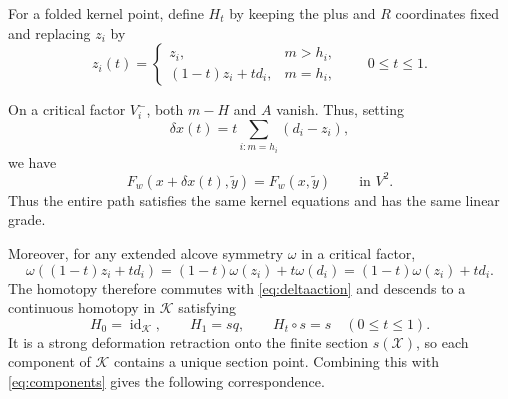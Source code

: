 \documentclass[11pt,a4paper,reqno]{amsart}
\theoremstyle{plain}
\theoremstyle{definition}
\theoremstyle{remark}
\numberwithin{equation}{section}
\DeclareMathOperator{\id}{id}
\begin{document}
For a folded kernel point, define $H_t$ by keeping the plus and $R$ coordinates fixed and replacing $z_i$ by
\begin{equation}\label{eq:homotopy}
z_i(t)=
\begin{cases}
z_i,&m>h_i,\\
(1-t)z_i+t d_i,&m=h_i,
\end{cases}
\qquad 0\le t\le1.
\end{equation}

On a critical factor $V_i^-$, both $m-H$ and $A$ vanish. Thus, setting
\[
\delta x(t)=t\sum_{i:m=h_i}(d_i-z_i),
\]
we have
\begin{equation}\label{eq:homotopykernel}
F_w(x+\delta x(t),\widetilde y)=F_w(x,\widetilde y)\qquad\text{in }V^2.
\end{equation}
Thus the entire path satisfies the same kernel equations and has the same linear grade.

Moreover, for any extended alcove symmetry $\omega$ in a critical factor,
\[
\omega((1-t)z_i+t d_i) =(1-t)\omega(z_i)+t\omega(d_i) =(1-t)\omega(z_i)+t d_i.
\]
The homotopy therefore commutes with \eqref{eq:deltaaction} and descends to a continuous homotopy in $\mathcal K$ satisfying
\begin{equation}\label{eq:retractionidentities}
H_0=\id_{\mathcal K},\qquad H_1=sq,\qquad H_t\circ s=s\quad(0\le t\le1).
\end{equation}
It is a strong deformation retraction onto the finite section $s(\mathcal X)$, so each component of $\mathcal K$ contains a unique section point. Combining this with \eqref{eq:components} gives the following correspondence.
\end{document}
